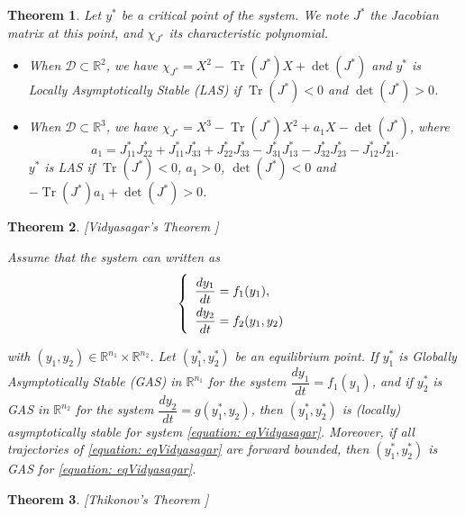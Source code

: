\documentclass{article}
\DeclareMathOperator{\Tr}{Tr}
\newtheorem{theorem}{Theorem}
\theoremstyle{definition}
\theoremstyle{remark}
\begin{document}
\begin{appendix}
\begin{theorem}
Let $y^*$ be a critical point of the system. We note $J^*$ the Jacobian matrix at this point, and $\chi_{J^*}$ its characteristic polynomial.

\begin{itemize}
\item When $\mathcal{D}\subset \mathbb{R}^2$, we have $\chi_{J^*} = X^2 - \Tr(J^*) X + \det(J^*)$ and $y^*$ is Locally Asymptotically Stable (LAS) if $\Tr(J^*) < 0$ and $\det(J^*) > 0$.
\item When $\mathcal{D}\subset \mathbb{R}^3$, we have $\chi_{J^*} = X^3 - \Tr(J^*) X^2 + a_1 X - \det(J^*)$, where $$a_1 = J^*_{11}J^*_{22} + J^*_{11} J^*_{33} + J^*_{22}J^*_{33} - J^*_{31}J^*_{13} - J^*_{32}J^*_{23} - J^*_{12}J^*_{21}.$$  $y^*$ is LAS if $\Tr(J^*) < 0$, $a_1 > 0$, $\det(J^*) < 0$ and $-\Tr(J^*) a_1 + \det(J^*) > 0$.
\end{itemize}
\end{theorem}

\begin{theorem} \label{theorem:Vidyasagar} [Vidyasagar's Theorem  \cite{vidyasagar_decomposition_1980, dumont_mathematical_2012}]

Assume that the system can written as
\begin{equation}
\def\arraystretch{2}
\left\{ \begin{array}{l}
\dfrac{dy_1}{dt} = f_1(y_1), \\
\dfrac{dy_2}{dt} = f_2(y_1, y_2) 
\end{array} \right.
\label{equation: eqVidyasagar}
\end{equation}

with $(y_1, y_2) \in \mathbb{R}^{n_1} \times\mathbb{R}^{n_2}$. Let $(y_1^*, y^*_2)$ be an equilibrium point.
If $y^*_1$ is Globally Asymptotically Stable (GAS) in $\mathbb{R}^{n_1}$ for the system $\dfrac{dy_1}{dt} = f_1(y_1)$, and if $y^*_2$ is GAS in $\mathbb{R}^{n_2}$ for the system $\dfrac{dy_2}{dt} = g(y_1^*, y_2)$, then $(y_1^*, y_2^*)$ is (locally) asymptotically stable for system \eqref{equation: eqVidyasagar}. Moreover, if all trajectories of \eqref{equation: eqVidyasagar} are forward bounded, then $(y_1^*, y_2^*)$ is GAS for \eqref{equation: eqVidyasagar}.
\end{theorem}

\begin{theorem} \label{theorem:Tikhonov} [Thikonov's Theorem \cite{banasiak_methods_2014}]


\end{theorem}
\end{appendix}
\end{document}
